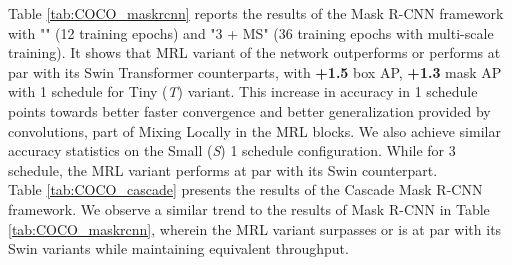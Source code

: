 \documentclass{article}
\begin{document}
\begin{table}[htbp]
  \centering
  \caption{Object detection and instance segmentation performance on the COCO val2017 with Cascade Mask R-CNN framework.}
  \label{tab:COCO_cascade}\end{table}

\noindent Table \ref{tab:COCO_maskrcnn} reports the results of the Mask R-CNN framework with "" (12 training epochs) and "3 + MS" (36 training epochs with multi-scale training). It shows that MRL variant of the network outperforms or performs at par with its Swin Transformer counterparts, with \textbf{+1.5} box AP, \textbf{+1.3} mask AP with 1 schedule for Tiny (\textit{T}) variant. This increase in accuracy in 1 schedule points towards better faster convergence and better generalization provided by convolutions, part of Mixing Locally in the MRL blocks. We also achieve similar accuracy statistics on the Small (\textit{S}) 1 schedule configuration. While for 3 schedule, the MRL variant performs at par with its Swin counterpart. \\
\noindent Table \ref{tab:COCO_cascade} presents the results of the Cascade Mask R-CNN framework. We observe a similar trend to the results of Mask R-CNN in Table \ref{tab:COCO_maskrcnn}, wherein the MRL variant surpasses or is at par with its Swin variants while maintaining equivalent throughput.
\end{document}

